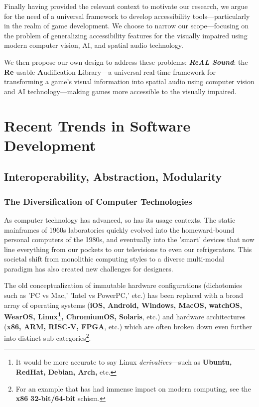 \documentclass{report}
\newcommand{\rs}{ReAL Sound\xspace}
\newcommand{\rsfull}{\textbf{Re}-usable \textbf{A}udification \textbf{L}ibrary\xspace}
\newcommand{\tech}[1]{\textbf{#1}}
\begin{document}
Finally having provided the relevant context to motivate our research, we argue for the need of a universal framework to develop accessibility tools---particularly in the realm of game development. We choose to narrow our scope---focusing on the problem of generalizing accessibility features for the visually impaired using modern computer vision, AI, and spatial audio technology. 

We then propose our own design to address these problems: \emph{\textbf{\rs}}: the \rsfull---a universal real-time framework for transforming a game's visual information into spatial audio using computer vision and AI technology---making games more accessible to the visually impaired.    

\section{Recent Trends in Software Development}
\subsection{Interoperability, Abstraction, Modularity}

\subsubsection{The Diversification of Computer Technologies}
As computer technology has advanced, so has its usage contexts. The static mainframes of 1960s laboratories quickly evolved into the homeward-bound personal computers of the 1980s, and eventually into the 'smart' devices that now line everything from our pockets to our televisions to even our refrigerators. This societal shift from monolithic computing styles to a diverse multi-modal paradigm has also created new challenges for designers. 

The old conceptualization of immutable hardware configurations (dichotomies such as 'PC vs Mac,' 'Intel vs PowerPC,' etc.) has been replaced with a broad array of operating systems (\tech{iOS, Android, Windows, MacOS, watchOS, WearOS, Linux\footnote{It would be more accurate to say Linux \emph{derivatives}---such as \tech{Ubuntu, RedHat, Debian, Arch,} etc.}, ChromiumOS, Solaris}, etc.) and hardware architectures (\tech{x86, ARM, RISC-V, FPGA}, etc.) which are often broken down even further into distinct sub-categories\footnote{For an example that has had immense impact on modern computing, see the \tech{x86} \tech{32-bit/64-bit} schism.}.
\end{document}

